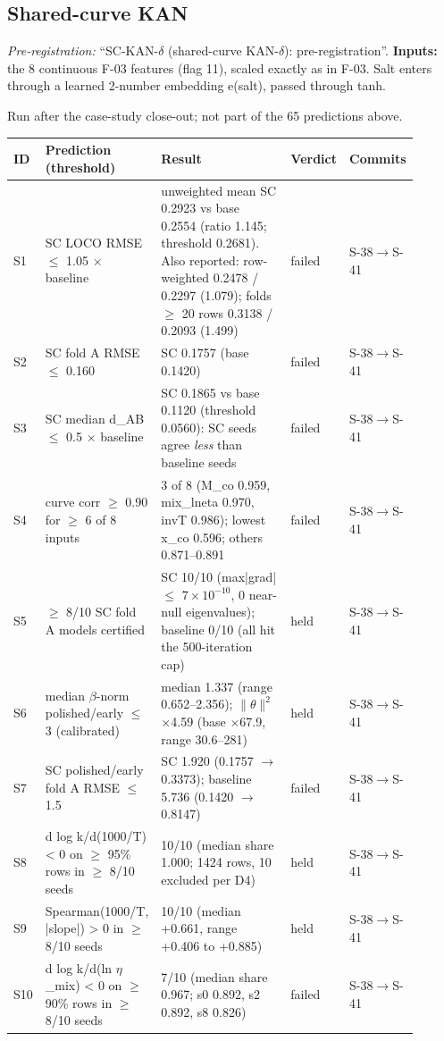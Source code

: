 \subsection{Shared-curve KAN}
\noindent\textit{Pre-registration:} ``SC-KAN-$\delta$ (shared-curve KAN-$\delta$): pre-registration''. \textbf{Inputs:} the 8 continuous F-03 features (flag 11), scaled exactly as in F-03. Salt enters through a learned 2-number embedding e(salt), passed through tanh.

Run after the case-study close-out; not part of the 65 predictions above.

{\footnotesize\setlength{\tabcolsep}{3pt}
\begin{longtable}{R{0.07\linewidth} R{0.28\linewidth} R{0.35\linewidth} R{0.09\linewidth} R{0.11\linewidth}}
\toprule
ID & Prediction (threshold) & Result & Verdict & Commits \\
\midrule
\endhead
S1 & SC LOCO RMSE $\leq$ 1.05 $\times$ baseline & unweighted mean SC 0.2923 vs base 0.2554 (ratio 1.145; threshold 0.2681). Also reported: row-weighted 0.2478 / 0.2297 (1.079); folds $\geq$ 20 rows 0.3138 / 0.2093 (1.499) & failed & S-38$\to$\allowbreak S-41 \\
S2 & SC fold A RMSE $\leq$ 0.160 & SC 0.1757 (base 0.1420) & failed & S-38$\to$\allowbreak S-41 \\
S3 & SC median d\_AB $\leq$ 0.5 $\times$ baseline & SC 0.1865 vs base 0.1120 (threshold 0.0560): SC seeds agree \emph{less} than baseline seeds & failed & S-38$\to$\allowbreak S-41 \\
S4 & curve corr $\geq$ 0.90 for $\geq$ 6 of 8 inputs & 3 of 8 (M\_co 0.959, mix\_lneta 0.970, invT 0.986); lowest x\_co 0.596; others 0.871--0.891 & failed & S-38$\to$\allowbreak S-41 \\
S5 & $\geq$ 8/10 SC fold A models certified & SC 10/10 (max|grad| $\leq$ $7\times10^{-10}$, 0 near-null eigenvalues); baseline 0/10 (all hit the 500-iteration cap) & held & S-38$\to$\allowbreak S-41 \\
S6 & median $\beta$-norm polished/early $\leq$ 3 (calibrated) & median 1.337 (range 0.652--2.356); $\|\theta\|^{2}$ $\times$4.59 (base $\times$67.9, range 30.6--281) & held & S-38$\to$\allowbreak S-41 \\
S7 & SC polished/early fold A RMSE $\leq$ 1.5 & SC 1.920 (0.1757 $\to$\allowbreak{} 0.3373); baseline 5.736 (0.1420 $\to$\allowbreak{} 0.8147) & failed & S-38$\to$\allowbreak S-41 \\
S8 & d log k/d(1000/T) < 0 on $\geq$ 95\% rows in $\geq$ 8/10 seeds & 10/10 (median share 1.000; 1424 rows, 10 excluded per D4) & held & S-38$\to$\allowbreak S-41 \\
S9 & Spearman(1000/T, |slope|) > 0 in $\geq$ 8/10 seeds & 10/10 (median +0.661, range +0.406 to +0.885) & held & S-38$\to$\allowbreak S-41 \\
S10 & d log k/d(ln $\eta$\_mix) < 0 on $\geq$ 90\% rows in $\geq$ 8/10 seeds & 7/10 (median share 0.967; s0 0.892, s2 0.892, s8 0.826) & failed & S-38$\to$\allowbreak S-41 \\
\bottomrule
\end{longtable}}
